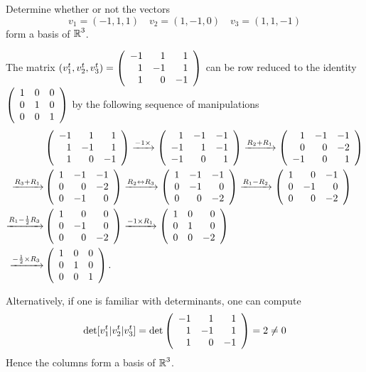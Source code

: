 \documentclass{ximera}
\author{Matthew Carr}
\begin{document}

\begin{exercise}\label{mc5_5A}

Determine whether or not the vectors  %
\[
v_1 = (-1,1,1) \quad v_2 = (1,-1,0) \quad v_3 = (1,1,-1)
\]
form a basis of $\mbox{$\Bbb{R}$}^3$.
  
\begin{solution}
\soln The matrix $(v_1^t, v_2^t, v_3^t)=\left(\begin{array}{rrrrrrrrrrrrrrrrrr} -1 & 1 & 1\\ 1 & -1 & 1\\ 1 & 0 & -1 \end{array}\right)$ can be row reduced to the identity $\left(\begin{array}{rrrrrrrrrrrrrrrrrr} 1 & 0 & 0\\ 0 & 1 & 0\\ 0 & 0 & 1 \end{array}\right)$ by the following sequence of manipulations
\begin{align*}
&\left(\begin{array}{rrrrrrrrrrrrrrrrrr} -1 & 1 & 1\\ 1 & -1 & 1\\ 1 & 0 & -1 \end{array}\right)\xrightarrow{-1\times }\left(\begin{array}{rrrrrrrrrrrrrrrrrr} 1 & -1 & -1\\ -1 & 1 & -1\\ -1 & 0 & 1 \end{array}\right)\xrightarrow{R_2+R_1}\left(\begin{array}{rrrrrrrrrrrrrrrrrr} 1 & -1 & -1\\ 0 & 0 & -2\\ -1 & 0 & 1 \end{array}\right)\\
\xrightarrow{R_3+R_1}&\left(\begin{array}{rrrrrrrrrrrrrrrrrr} 1 & -1 & -1\\ 0 & 0 & -2\\ 0 & -1 & 0 \end{array}\right)\xrightarrow{R_2\leftrightarrow R_3}\left(\begin{array}{rrrrrrrrrrrrrrrrrr} 1 & -1 &-1\\ 0 & -1 & 0\\ 0 & 0 & -2 \end{array}\right)\xrightarrow{R_1-R_2}\left(\begin{array}{rrrrrrrrrrrrrrrrrr} 1 & 0 &-1\\ 0 & -1 & 0\\ 0 & 0 & -2 \end{array}\right)\\
\xrightarrow{R_1-\frac{1}{2}R_3}&\left(\begin{array}{rrrrrrrrrrrrrrrrrr} 1 & 0 &0\\ 0 & -1 & 0\\ 0 & 0 & -2 \end{array}\right)\xrightarrow{-1\times R_1}\left(\begin{array}{rrrrrrrrrrrrrrrrrr} 1 & 0 &0\\ 0 & 1 & 0\\ 0 & 0 & -2 \end{array}\right)\\
\xrightarrow{-\frac{1}{2}\times R_3}&\left(\begin{array}{rrrrrrrrrrrrrrrrrr} 1 & 0 &0\\ 0 & 1 & 0\\ 0 & 0 & 1 \end{array}\right)\ldotp
\end{align*}


Alternatively, if one is familiar with determinants, one can compute
\[
\det [v_1^t | v_2^t | v_3^t] =\det\left(\begin{array}{rrrrrrrrrrrrrrrrrr} -1 & 1 & 1\\ 1 & -1 & 1\\ 1 & 0 & -1 \end{array}\right) = 2 \neq 0
\]
Hence the columns form a basis of $\mbox{$\Bbb{R}$}^3$.
\end{solution}
\end{exercise}
\end{document}
